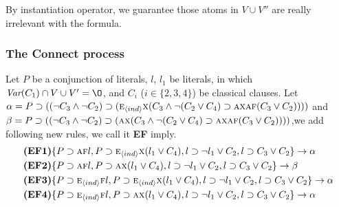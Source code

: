 \documentclass[runningheads]{llncs}
\newcommand{\tuple}[1]{{\langle{#1}\rangle}}
\newcommand{\rto}{\rightarrow}
\newcommand{\Var}{\textit{Var}}
\newcommand{\ALL}{\textsc{a}}
\newcommand{\EXIST}{\textsc{e}}
\newcommand{\NEXT}{\textsc{x}}
\newcommand{\FUTURE}{\textsc{f}}
\begin{document}
By instantiation operator, we guarantee those atoms in $V\cup V''$ are really irrelevant with the formula.


\subsubsection{The Connect process}
Let $P$ be a conjunction of literals, $l$, $l_1$ be literals, in which $\Var(C_1)\cap V \cup V' = {\O}$, and $C_i$ ($i\in \{2,3,4\}$) be classical clauses.
Let $\alpha=P \supset ((\neg C_3 \wedge \neg C_2) \supset  (\EXIST_{\tuple{ind}}\NEXT(C_3 \wedge \neg (C_2 \vee C_4) \supset \ALL\NEXT \ALL\FUTURE(C_3 \vee C_2))))$ and $\beta = P \supset ((\neg C_3 \wedge \neg C_2) \supset (\ALL\NEXT(C_3 \wedge  \neg (C_2 \vee C_4) \supset \ALL\NEXT \ALL\FUTURE(C_3 \vee C_2))))$,we add following new rules, we call it \textbf{EF} imply.
\begin{align*}
& \textbf{(EF1)} \{P\supset \ALL\FUTURE l, P\supset \EXIST_{\tuple{ind}}\NEXT (l_1 \vee C_4),
  l \supset \neg l_1 \vee C_2, l \supset C_3\vee C_2\} \rto \alpha \\
& \textbf{(EF2)} \{P\supset \ALL\FUTURE l, P\supset \ALL \NEXT (l_1 \vee C_4),
 l \supset \neg l_1 \vee C_2, l \supset C_3\vee C_2\} \rto \beta \\
& \textbf{(EF3)} \{P\supset \EXIST_{\tuple{ind}}\FUTURE l, P\supset \EXIST_{\tuple{ind}}\NEXT (l_1 \vee C_4),
  l \supset \neg l_1 \vee C_2, l \supset C_3\vee C_2\} \rto \alpha  \\
& \textbf{(EF4)} \{P\supset \EXIST_{\tuple{ind}}\FUTURE l, P\supset \ALL\NEXT (l_1 \vee C_4),
 l \supset \neg l_1 \vee C_2, l \supset C_3\vee C_2\} \rto \alpha \\
\end{align*}
\end{document}
